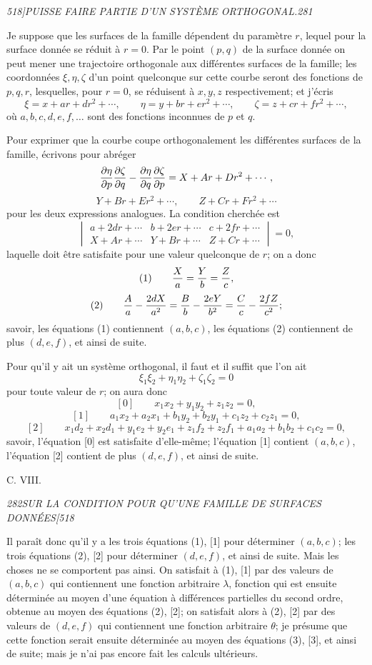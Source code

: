 \documentclass[11pt]{article}
\newcommand{\phead}[3]{\noindent\textit{#1\hfill #2\hfill #3}\par\medskip}
\begin{document}
\clearpage

\phead{518]}{PUISSE FAIRE PARTIE D'UN SYST\`EME ORTHOGONAL.}{281}

Je suppose que les surfaces de la famille d\'ependent du param\`etre $r$, lequel pour la
surface donn\'ee se r\'eduit \`a $r=0$. Par le point $(p,q)$ de la surface donn\'ee on peut
mener une trajectoire orthogonale aux diff\'erentes surfaces de la famille; les
coordonn\'ees $\xi,\eta,\zeta$ d'un point quelconque sur cette courbe seront des fonctions
de $p,q,r$, lesquelles, pour $r=0$, se r\'eduisent \`a $x,y,z$ respectivement; et j'\'ecris
\[
\xi=x+ar+dr^2+\cdots,\qquad
\eta=y+br+er^2+\cdots,\qquad
\zeta=z+cr+fr^2+\cdots,
\]
o\`u $a,b,c,d,e,f,\ldots$ sont des fonctions inconnues de $p$ et $q$.

Pour exprimer que la courbe coupe orthogonalement les diff\'erentes surfaces de la
famille, \'ecrivons pour abr\'eger
\[
{\partial\eta\over\partial p}{\partial\zeta\over\partial q}
-{\partial\eta\over\partial q}{\partial\zeta\over\partial p}
=X+Ar+Dr^2+\cdots,
\]
\[
Y+Br+Er^2+\cdots,\qquad Z+Cr+Fr^2+\cdots
\]
pour les deux expressions analogues. La condition cherch\'ee est
\[
\begin{vmatrix}
a+2dr+\cdots&b+2er+\cdots&c+2fr+\cdots\\
X+Ar+\cdots&Y+Br+\cdots&Z+Cr+\cdots
\end{vmatrix}=0,
\]
laquelle doit \^etre satisfaite pour une valeur quelconque de $r$; on a donc
\[
(1)\qquad {X\over a}={Y\over b}={Z\over c},
\]
\[
(2)\qquad {A\over a}-{2dX\over a^2}
={B\over b}-{2eY\over b^2}
={C\over c}-{2fZ\over c^2};
\]
savoir, les \'equations (1) contiennent $(a,b,c)$, les \'equations (2) contiennent de plus
$(d,e,f)$, et ainsi de suite.

Pour qu'il y ait un syst\`eme orthogonal, il faut et il suffit que l'on ait
\[
\xi_1\xi_2+\eta_1\eta_2+\zeta_1\zeta_2=0
\]
pour toute valeur de $r$; on aura donc
\[
[0]\qquad x_1x_2+y_1y_2+z_1z_2=0,
\]
\[
[1]\qquad a_1x_2+a_2x_1+b_1y_2+b_2y_1+c_1z_2+c_2z_1=0,
\]
\[
[2]\qquad x_1d_2+x_2d_1+y_1e_2+y_2e_1+z_1f_2+z_2f_1+a_1a_2+b_1b_2+c_1c_2=0,
\]
savoir, l'\'equation [0] est satisfaite d'elle-m\^eme; l'\'equation [1] contient
$(a,b,c)$, l'\'equation [2] contient de plus $(d,e,f)$, et ainsi de suite.

\hfill C. VIII.
\clearpage

\phead{282}{SUR LA CONDITION POUR QU'UNE FAMILLE DE SURFACES DONN\'EES}{[518}

Il para\^it donc qu'il y a les trois \'equations (1), [1] pour d\'eterminer $(a,b,c)$; les
trois \'equations (2), [2] pour d\'eterminer $(d,e,f)$, et ainsi de suite. Mais les choses ne
se comportent pas ainsi. On satisfait \`a (1), [1] par des valeurs de $(a,b,c)$ qui
contiennent une fonction arbitraire $\lambda$, fonction qui est ensuite d\'etermin\'ee au
moyen d'une \'equation \`a diff\'erences partielles du second ordre, obtenue au moyen des
\'equations (2), [2]; on satisfait alors \`a (2), [2] par des valeurs de $(d,e,f)$ qui
contiennent une fonction arbitraire $\theta$; je pr\'esume que cette fonction serait ensuite
d\'etermin\'ee au moyen des \'equations (3), [3], et ainsi de suite; mais je n'ai pas encore
fait les calculs ult\'erieurs.
\end{document}
